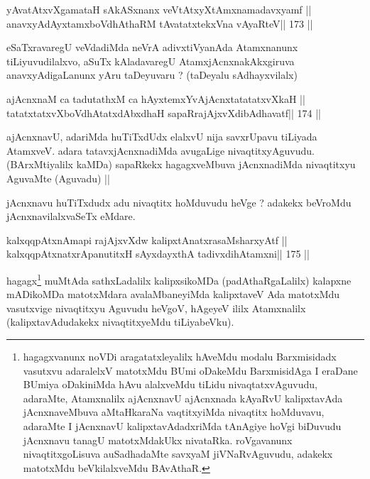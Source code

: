 \begin{shl}
yAvatAtxvXgamataH sAkASxnanx veVtAtxyXtAmxnamadavxyamf ||
anavxyAdAyxtamxboVdhAthaRM tAvatatxtekxVna vAyaRteV\hfill || 173 ||
\end{shl}

\begin{artha}
eSaTxravaregU veVdadiMda neVrA adivxtiVyanAda Atamxnanunx tiLiyuvudilalxvo, aSuTx kAladavaregU AtamxjAcnxnakAkxgiruva anavxyAdigaLanunx yAru taDeyuvaru ? (taDeyalu sAdhayxvilalx)
\end{artha}

\begin{shl}
ajAcnxnaM ca tadutathxM ca hAyxtemxYvAjAcnxtatatatxvXkaH ||
tatatxtatxvXboVdhAtatxdAbxdhaH sapaRrajAjxvXdibAdhavatf\hfill || 174 ||
\end{shl}

\begin{artha}
ajAcnxnavU, adariMda huTiTxdUdx elalxvU nija savxrUpavu tiLiyada 
AtamxveV. adara tatavxjAcnxnadiMda avugaLige nivaqtitxyAguvudu. 
(BArxMtiyalilx kaMDa) sapaRkekx hagagxveMbuva jAcnxnadiMda nivaqtitxyu 
AguvaMte (Aguvadu) ||
\end{artha}

\begin{artha}
jAcnxnavu huTiTxdudx adu nivaqtitx hoMduvudu heVge ? adakekx beVroMdu jAcnxnavilalxvaSeTx eMdare.
\end{artha}

\begin{shl}
kalxqqpAtxnAmapi rajAjxvXdw kalipxtAnatxrasaMsharxyAtf ||
kalxqqpAtxnatxrApanutitxH sAyxdayxthA tadivxdihA\s\s tamxni\hfill || 175 ||
\end{shl}

\begin{artha}
hagagx\footnote[12]{hagagxvanunx noVDi aragatatxleyalilx hAveMdu modalu Barxmisidadx vasutxvu adaralelxV matotxMdu BUmi oDakeMdu BarxmisidAga I eraDane BUmiya oDakiniMda hAvu alalxveMdu tiLidu nivaqtatxvAguvudu, adaraMte, Atamxnalilx ajAcnxnavU ajAcnxnada kAyaRvU kalipxtavAda jAcnxnaveMbuva aMtaHkaraNa vaqtitxyiMda nivaqtitx hoMduvavu, adaraMte I jAcnxnavU kalipxtavAdadxriMda tAnAgiye hoVgi biDuvudu jAcnxnavu tanagU matotxMdakUkx nivataRka. roVgavanunx nivaqtitxgoLisuva auSadhadaMte savxyaM jiVNaRvAguvudu, adakekx matotxMdu beVkilalxveMdu BAvAthaR.} muMtAda sathxLadalilx kalipxsikoMDa (padAthaRgaLalilx) kalapxne mADikoMDa matotxMdara avalaMbaneyiMda kalipxtaveV Ada matotxMdu vasutxvige nivaqtitxyu Aguvudu heVgoV, hAgeyeV ililx Atamxnalilx (kalipxtavAdudakekx nivaqtitxyeMdu tiLiyabeVku).
\end{artha}

